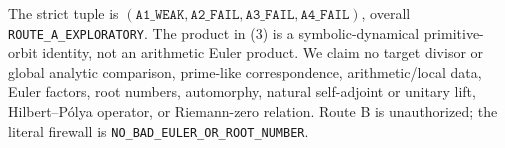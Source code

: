 \documentclass[10pt]{article}
\begin{document}
The strict tuple is $(\texttt{A1\_WEAK},\texttt{A2\_FAIL},
\texttt{A3\_FAIL},\texttt{A4\_FAIL})$, overall
\texttt{ROUTE\_A\_EXPLORATORY}.  The product in (3) is a symbolic-dynamical
primitive-orbit identity, not an arithmetic Euler product.  We claim no target
divisor or global analytic comparison, prime-like correspondence,
arithmetic/local data, Euler factors, root numbers, automorphy, natural
self-adjoint or unitary lift, Hilbert--P\'olya operator, or Riemann-zero
relation.  Route B is unauthorized; the literal firewall is
\texttt{NO\_BAD\_EULER\_OR\_ROOT\_NUMBER}.
\end{document}
